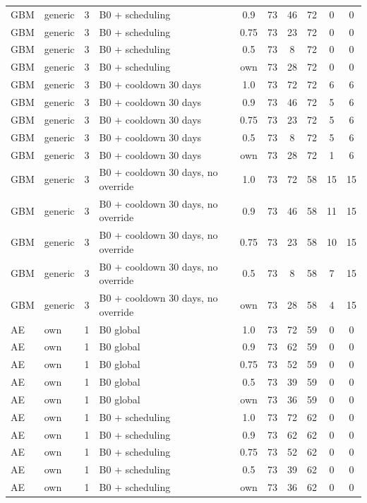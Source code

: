 \documentclass[10pt,onecolumn,letterpaper]{article}
\begin{document}
\begin{longtable}{lllp{4.4cm}cccccc}
GBM & generic & 3 & B0 + scheduling & 0.9 & 73 & 46 & 72 & 0 & 0 \\
GBM & generic & 3 & B0 + scheduling & 0.75 & 73 & 23 & 72 & 0 & 0 \\
GBM & generic & 3 & B0 + scheduling & 0.5 & 73 & 8 & 72 & 0 & 0 \\
GBM & generic & 3 & B0 + scheduling & own & 73 & 28 & 72 & 0 & 0 \\
GBM & generic & 3 & B0 + cooldown 30 days & 1.0 & 73 & 72 & 72 & 6 & 6 \\
GBM & generic & 3 & B0 + cooldown 30 days & 0.9 & 73 & 46 & 72 & 5 & 6 \\
GBM & generic & 3 & B0 + cooldown 30 days & 0.75 & 73 & 23 & 72 & 5 & 6 \\
GBM & generic & 3 & B0 + cooldown 30 days & 0.5 & 73 & 8 & 72 & 5 & 6 \\
GBM & generic & 3 & B0 + cooldown 30 days & own & 73 & 28 & 72 & 1 & 6 \\
GBM & generic & 3 & B0 + cooldown 30 days, no override & 1.0 & 73 & 72 & 58 & 15 & 15 \\
GBM & generic & 3 & B0 + cooldown 30 days, no override & 0.9 & 73 & 46 & 58 & 11 & 15 \\
GBM & generic & 3 & B0 + cooldown 30 days, no override & 0.75 & 73 & 23 & 58 & 10 & 15 \\
GBM & generic & 3 & B0 + cooldown 30 days, no override & 0.5 & 73 & 8 & 58 & 7 & 15 \\
GBM & generic & 3 & B0 + cooldown 30 days, no override & own & 73 & 28 & 58 & 4 & 15 \\
AE & own & 1 & B0 global & 1.0 & 73 & 72 & 59 & 0 & 0 \\
AE & own & 1 & B0 global & 0.9 & 73 & 62 & 59 & 0 & 0 \\
AE & own & 1 & B0 global & 0.75 & 73 & 52 & 59 & 0 & 0 \\
AE & own & 1 & B0 global & 0.5 & 73 & 39 & 59 & 0 & 0 \\
AE & own & 1 & B0 global & own & 73 & 36 & 59 & 0 & 0 \\
AE & own & 1 & B0 + scheduling & 1.0 & 73 & 72 & 62 & 0 & 0 \\
AE & own & 1 & B0 + scheduling & 0.9 & 73 & 62 & 62 & 0 & 0 \\
AE & own & 1 & B0 + scheduling & 0.75 & 73 & 52 & 62 & 0 & 0 \\
AE & own & 1 & B0 + scheduling & 0.5 & 73 & 39 & 62 & 0 & 0 \\
AE & own & 1 & B0 + scheduling & own & 73 & 36 & 62 & 0 & 0 \\

\end{longtable}
\end{document}
